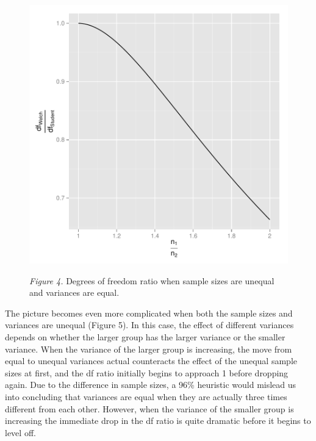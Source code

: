 \documentclass[man,a4paper,noextraspace,apacite]{apa6}
\begin{document}
\begin{figure}
\includegraphics{WelchManuscript-abridged-dfratiosDiffNratios}

\textit{Figure 4.} Degrees of freedom ratio when sample sizes are unequal and variances are equal.
\end{figure}

    The picture becomes even more complicated when both the sample sizes and variances are unequal (Figure 5). In this case, the effect of different variances depends on whether the larger group has the larger variance or the smaller variance. When the variance of the larger group is increasing, the move from equal to unequal variances actual counteracts the effect of the unequal sample sizes at first, and the df ratio initially begins to approach 1 before dropping again. Due to the difference in sample sizes, a 96\% heuristic would mislead us into concluding that variances are equal when they are actually three times different from each other. However, when the variance of the smaller group is increasing the immediate drop in the df ratio is quite dramatic before it begins to level off. 
\end{document}

